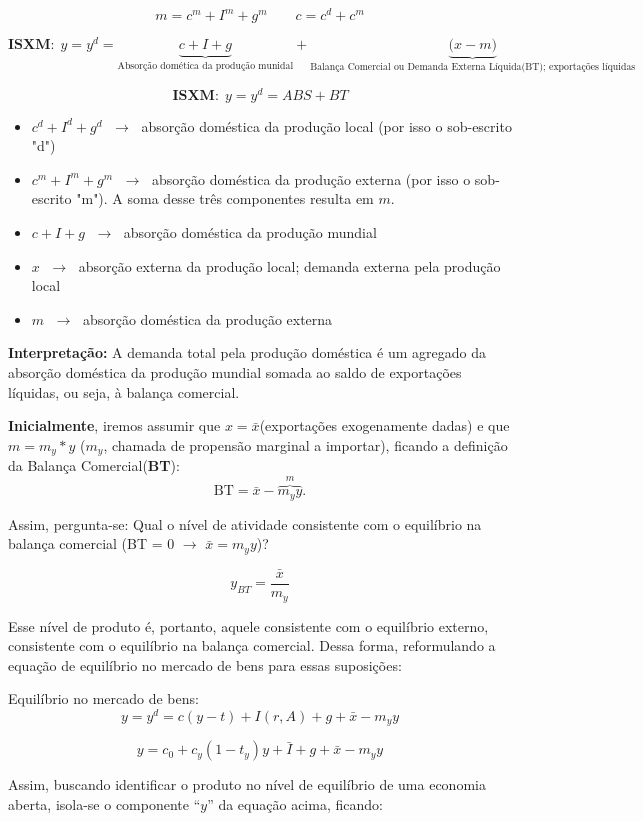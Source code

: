 \documentclass[a4paper,12pt]{article}[abntex2]
\begin{document}
\[
m=c^{m}+I^{m}+g^{m}
\qquad
c=c^{d}+c^{m}
\]

\[
\textbf{ISXM:} \ \ y=y^{d}=\underbrace{c+I+g}_{\text{Absorção domética da produção munidal}}+\underbrace{\bigl(x-m\bigr)}_{\text{Balança Comercial ou Demanda Externa Líquida(BT); exportações líquidas}}
\]

\[
\textbf{ISXM:} \ \ y=y^{d}= ABS + BT
\]

\begin{itemize}
\item $c^{d}+I^{d}+g^{d}$ $\;\rightarrow\;$ absorção doméstica da produção local (por isso o sob-escrito "d")
\item $c^{m}+I^{m}+g^{m}$ $\;\rightarrow\;$ absorção doméstica da produção externa (por isso o sob-escrito "m"). A soma desse três componentes resulta em \(m\).
\item $c+I+g$ $\;\rightarrow\;$ absorção doméstica da produção mundial
\item $x$ $\;\rightarrow\;$ absorção externa da produção local; demanda externa pela produção local
\item $m$ $\;\rightarrow\;$ absorção doméstica da produção externa
\end{itemize}

\textbf{Interpretação:} A demanda total pela produção doméstica é um agregado da absorção doméstica da produção mundial somada ao saldo de exportações líquidas, ou seja, à balança comercial.


\textbf{Inicialmente}, iremos assumir que $x = \bar{x}$(exportações exogenamente dadas) e que $m = m_y \ast y$ (\textbf{\(m_y\)}, chamada de propensão marginal a importar), ficando a definição da Balança Comercial(\textbf{BT}): 
\[
\text{BT} = \bar{x} - \overbrace{m_y y}^{m}.
\]

Assim, pergunta-se: Qual o nível de atividade consistente com o equilíbrio na balança comercial (BT = 0 $\rightarrow$ $\bar{x} = m_y y$)?

\[
y_{BT} = \frac{\bar{x}}{m_y}
\]

Esse nível de produto é, portanto, aquele consistente com o equilíbrio externo, consistente com o equilíbrio na balança comercial.  
Dessa forma, reformulando a equação de equilíbrio no mercado de bens para essas suposições:


Equilíbrio no mercado de bens: 
\[
y = y^d = c(y-t) + I(r,A) + g + \bar{x} - m_y y
\]

\[
y = c_0 + c_y(1-t_y)y + \bar{I} + g + \bar{x} - m_y y
\]

Assim, buscando identificar o produto no nível de equilíbrio de uma economia aberta, isola-se o componente ``$y$'' da equação acima, ficando:
\end{document}

